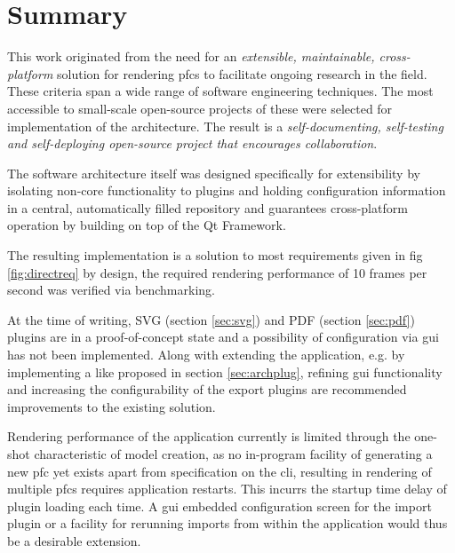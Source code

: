 \chapter{Summary}
\label{cha:Summary}
This work originated from the need for an \emph{extensible, maintainable, cross-platform} solution for rendering \gls{pfc}s to facilitate ongoing research in the field.
These criteria span a wide range of software engineering techniques. The most accessible to small-scale open-source projects of these were selected for implementation of the architecture.
The result is a \emph{self-documenting, self-testing and self-deploying open-source project that encourages collaboration}.

The software architecture itself was designed specifically for extensibility by isolating non-core functionality to plugins and holding configuration information in a central, automatically filled repository and guarantees cross-platform operation by building on top of the Qt Framework.

The resulting implementation is a solution to most requirements given in fig \ref{fig:directreq} by design, the required rendering performance of 10 frames per second was verified via benchmarking.


At the time of writing, SVG (section \ref{sec:svg}) and PDF (section \ref{sec:pdf}) plugins are in a proof-of-concept state and a possibility of configuration via \gls{gui} has not been implemented. Along with extending the application, e.g. by implementing a  like proposed in section \ref{sec:archplug}, refining \gls{gui} functionality and increasing the configurability of the export plugins are recommended improvements to the existing solution.

Rendering performance of the application currently is limited through the one-shot characteristic of model creation, as no in-program facility of generating a new \gls{pfc} yet exists apart from specification on the \gls{cli}, resulting in rendering of multiple \gls{pfc}s requires application restarts. This incurrs the startup time delay of plugin loading each time. A \gls{gui} embedded configuration screen for the import plugin or a facility for rerunning imports from within the application would thus be a desirable extension.
